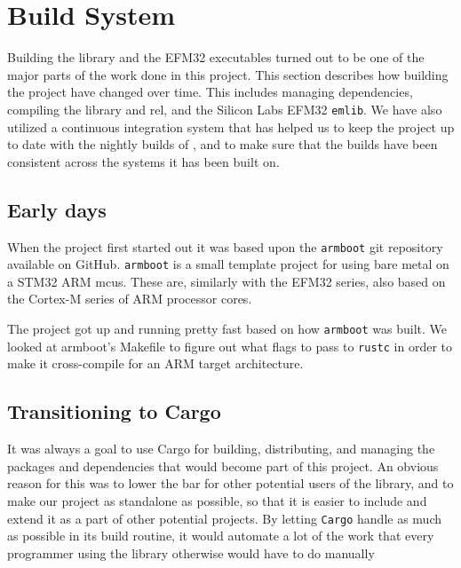 \section{Build System}
\label{sec:build_system}

Building the library and the EFM32 executables turned out to be one of the major parts of the work done in this project.
This section describes how building the project have changed over time.
This includes managing dependencies, compiling the {\core} library and \gls{rel}, and the Silicon Labs EFM32 \texttt{emlib}.
We have also utilized a continuous integration system that has helped us to keep the project up to date with the nightly builds of {\rust}, and to make sure that the builds have been consistent across the systems it has been built on.

\subsection{Early days}
\label{ssub:using_make}

When the project first started out it was based upon the \texttt{armboot} \cite{github:armboot} git repository available on GitHub.
\texttt{armboot} is a small template project for using {\rust} bare metal on a STM32 ARM \glspl{mcu}.
These are, similarly with the EFM32 series, also based on the Cortex-M series of ARM processor cores.

The project got up and running pretty fast based on how \texttt{armboot} was built.
We looked at armboot's Makefile to figure out what flags to pass to \texttt{rustc} in order to make it cross-compile for an ARM target architecture.

\subsection{Transitioning to Cargo}
\label{ssub:transitioning_to_cargo}

It was always a goal to use Cargo for building, distributing, and managing the packages and dependencies that would become part of this project.
An obvious reason for this was to lower the bar for other potential users of the library, and to make our project as standalone as possible, so that it is easier to include and extend it as a part of other potential projects.
By letting \texttt{Cargo} handle as much as possible in its build routine, it would automate a lot of the work that every programmer using the library otherwise would have to do manually

